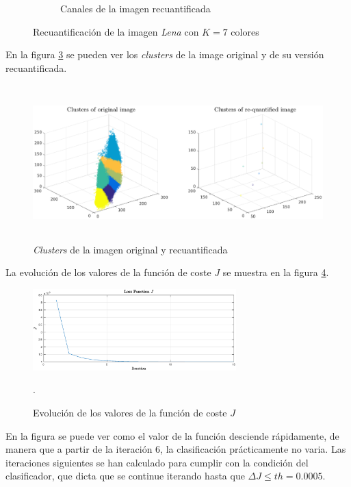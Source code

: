 \documentclass[11pt]{article} %
\begin{document}
\begin{figure}[h]
\begin{subfigure}[b]{0.435\textwidth}
        \caption[]{Canales de la imagen recuantificada}
        \label{fig:22:requant:rgb}
    \end{subfigure}
    \caption{Recuantificación de la imagen \emph{Lena} con $K=7$ colores}
    \label{fig:22:classification}
\end{figure}

En la figura \ref{fig:22:clusters} se pueden ver los \emph{clusters} de la
image original y de su versión recuantificada.

\begin{figure}[h]
    \includegraphics[width=\textwidth, height=6cm]{../src/fig/22_lena_clusters.eps}
    \caption[]{\emph{Clusters} de la imagen original y recuantificada}
    \label{fig:22:clusters}
\end{figure}

\clearpage
{}

La evolución de los valores de la función de coste $J$ se muestra en la figura
\ref{fig:22:cost}.

\begin{figure}[h]
    \centering
    \includegraphics[width=0.7\textwidth]{../src/fig/22_cost.eps}
    \caption[]{Evolución de los valores de la función de coste $J$}.
    \label{fig:22:cost}
\end{figure}

En la figura se puede ver como el valor de la función desciende rápidamente, de
manera que a partir de la iteración 6, la clasificación prácticamente no varia.
Las iteraciones siguientes se han calculado para cumplir con la condición del
clasificador, que dicta que se continue iterando hasta
que $\Delta J \leq th = 0.0005$.
\end{document}
